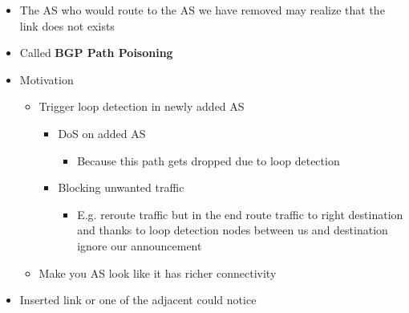 \begin{itemize}
\begin{itemize}
\begin{itemize}
\begin{itemize}
\begin{itemize}
\begin{itemize}
                                            \item The AS who would route to the AS we have removed may realize that the link does not exists
                                        \end{itemize}
                                \end{itemize}
                                \begin{itemize}
                                    \item Called \textbf{BGP Path Poisoning}
                                    \item Motivation
                                        \begin{itemize}
                                            \item Trigger loop detection in newly added AS
                                                \begin{itemize}
                                                    \item DoS on added AS
                                                        \begin{itemize}
                                                            \item Because this path gets dropped due to loop detection
                                                        \end{itemize}
                                                    \item Blocking unwanted traffic
                                                        \begin{itemize}
                                                            \item E.g. reroute traffic but in the end route traffic to right destination and thanks to loop detection nodes between us and destination ignore our announcement
                                                        \end{itemize}
                                                \end{itemize}
                                            \item Make you AS look like it has richer connectivity
                                        \end{itemize}
                                    \item Inserted link or one of the adjacent could notice

\end{itemize}
\end{itemize}
\end{itemize}
\end{itemize}
\end{itemize}
